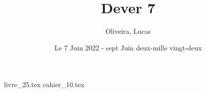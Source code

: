 \documentclass{article}
\title{Dever 7}
\author{Oliveira, Lucas}
\date{Le 7 Juin 2022 - sept Juin deux-mille vingt-deux}
\begin{document}
    \maketitle
    \tableofcontents

    \newpage
    {livre_25.tex}
    {cahier_10.tex}
\end{document}
